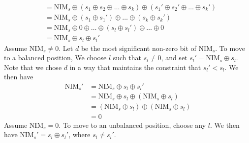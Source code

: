 \documentclass[11pt]{article}
\begin{document}
\begin{enumerate}[8.1]
\begin{align*}
                  &= \text{NIM}_s \oplus (s_1 \oplus s_2 \oplus \hdots \oplus s_k ) \oplus (s_1' \oplus s_2' \oplus \hdots \oplus s_k' ) \\
                  &= \text{NIM}_s \oplus (s_1 \oplus s_1') \oplus \hdots \oplus (s_k \oplus s_k') \\
                  &= \text{NIM}_s \oplus 0 \oplus \hdots \oplus (s_l \oplus s_l') \oplus \hdots \oplus 0 \\
                  &= \text{NIM}_s \oplus s_l \oplus s_l'
  \end{align*}
  Assume $\text{NIM}_s \neq 0$. Let $d$ be the most significant non-zero bit of $\text{NIM}_s$. To move to a balanced position, We choose $l$ such that $s_l \neq 0$, and set $s_l' = \text{NIM}_s \oplus s_l$. Note that we chose $d$ in a way that maintains the constraint that $s_l' < s_l$. We then have
  \begin{align*}
    \text{NIM}_s'&= \text{NIM}_s \oplus s_l \oplus s_l' \\
                 &= \text{NIM}_s \oplus s_l \oplus (\text{NIM}_s \oplus s_l) \\
                 &= (\text{NIM}_s \oplus s_l) \oplus (\text{NIM}_s \oplus s_l) \\
                 &= 0
  \end{align*}
  Assume $\text{NIM}_s = 0$. To move to an unbalanced position, choose any $l$. We then have $\text{NIM}_s' = s_l \oplus s_l'$, where $s_l \neq s_l'$.
  \end{enumerate}
\end{document}
